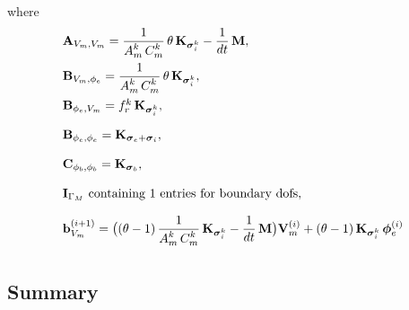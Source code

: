 where
\begin{equation*}
  \begin{array}{lll}
    \bfA_{V_m,V_m} = \dfrac{1}{A_m^k\,C_m^k}\theta\,\bfK_{\bfsigma_i^k} -\dfrac{1}{dt}\bfM,\\[4mm]
    \bfB_{V_m,\phi_e} = \dfrac{1}{A_m^k\,C_m^k}\theta\,\bfK_{\bfsigma_i^k},\\[4mm]
    \bfB_{\phi_e,V_m} = f_r^k \,\bfK_{\bfsigma_i^k},\\[4mm]
    \bfB_{\phi_e,\phi_e} = \bfK_{\bfsigma_e + \bfsigma_i},\\[4mm]
    \bfC_{\phi_b,\phi_b} = \bfK_{\bfsigma_b},\\[4mm]
    \bfI_{\Gamma_M} \text{ containing 1 entries for boundary dofs},\\[4mm]
    \bfb_{V_m}^{(i+1)} = \big((\theta-1)\, \dfrac{1}{A_m^k\,C_m^k}\bfK_{\bfsigma_i^k} - \dfrac{1}{dt}\bfM\big) \bfV_m^{(i)} 
      + (\theta - 1)\,\bfK_{\bfsigma_i^k}\,\bfphi_e^{(i)}\\[4mm]
  \end{array}
\end{equation*}



\subsection{Summary}

\newpage
\nocite{*}
{}


%


